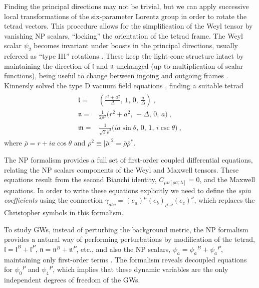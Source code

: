 Finding the principal directions may not be trivial, but we can apply successive local transformations of the six-parameter Lorentz group in order to rotate the tetrad vectors. 
This procedure allows for the simplification of the Weyl tensor by vanishing NP scalars, ``locking'' the orientation of the tetrad frame.
The Weyl scalar $\psi_2$ becomes invariant under boosts in the principal directions, usually refereed as ``type III'' rotations \cite{Chandrasekhar1998}.
These keep the light-cone structure intact by maintaining the direction of $\bm{\mathfrak{l}}$ and $\bm{\mathfrak{n}}$ unchanged (up to multiplication of scalar functions), being useful to change between ingoing and outgoing frames \cite{Teukolsky1974}. 
Kinnersly solved the type D vacuum field equations \cite{Kinnersley1969}, finding a suitable tetrad 
\begin{align}
    \label{eq3:kinnerslytetrad}
    \begin{split}
        \bm{\mathfrak{l}} =& \left(\frac{r^2+a^2}{\Delta}, \, 1, \,0, \,\frac{a}{\Delta} \right) ~, \\
        \bm{\mathfrak{n}} =& \frac{1}{2 \rho^2} \Bigr( r^2+a^2, \,-\Delta, \,0 , \,a \Bigr) ~, \\
        \bm{\mathfrak{m}} =& \frac{1}{ \sqrt{2} \bar{\rho}^2 } \Bigr( i a \sin\theta, \,0, \,1, \, i \csc\theta \Bigr) ~,
    \end{split}
\end{align}
where $\bar{\rho} = r + i a \cos\theta$ and $\rho^2 \equiv | \bar{\rho} |^2 = \bar{\rho} \bar{\rho}^*$.

The NP formalism provides a full set of first-order coupled differential equations, relating the NP scalars components of the Weyl and Maxwell tensors. 
These equations result from the second Bianchi identity, $C_{\mu\nu[\rho \sigma ; \lambda ]} = 0$, and the Maxwell equations.
In order to write these equations explicitly we need to define the \emph{spin coefficients} using the connection $\gamma_{abc} = (e_{a})^\mu (e_{b})_{\mu;\nu} (e_{c})^\nu$, which replaces the Christopher symbols in this formalism.

To study GWs, instead of perturbing the background metric, the NP formalism provides a natural way of performing perturbations by modification of the tetrad, $\bm{\mathfrak{l}}=\bm{\mathfrak{l}}^B+\bm{\mathfrak{l}}^P$, $\bm{\mathfrak{n}}=\bm{\mathfrak{n}}^B+\bm{\mathfrak{n}}^P$, etc., and also the NP scalars, $\psi_a = \psi_a{}^B + \psi_a{}^P$, maintaining only first-order terms \cite{Teukolsky1973a}.
The formalism reveals decoupled equations for $\psi_0{}^P$ and $\psi_4{}^P$, which implies that these dynamic variables are the only independent degrees of freedom of the GWs.


